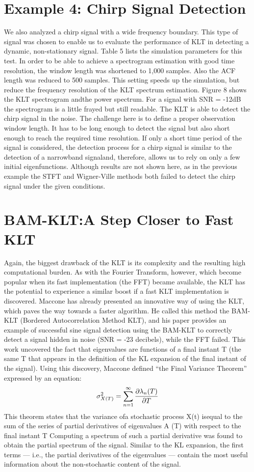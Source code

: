 \documentclass[12pt]{report}
\begin{document}
\section*{Example 4: Chirp Signal Detection}
We also analyzed a chirp signal with a wide frequency boundary. This type of
signal was chosen to enable us to evaluate the performance of KLT in detecting
a dynamic, non-stationary signal. Table 5 lists the simulation parameters for this test.
In order to be able to achieve a spectrogram estimation with good time resolution, the window length was shortened to 1,000 samples. Also the ACF length was reduced to 500 samples. This setting speeds up the simulation, but reduce the frequency resolution of the KLT spectrum estimation.
Figure 8 shows the KLT spectrogram andthe power spectrum. For a signal with SNR = -12dB the spectrogram is a little frayed but still readable. The KLT is able to detect the chirp signal in the noise.
The challenge here is to define a proper observation window length. It has to be long enough to detect the signal but also short enough to reach the required time resolution. If only a short time period of the signal is considered, the detection process for a chirp signal is similar to the detection of a narrowband signaland, therefore, allows us to rely on only a few initial eigenfunctions.
Although results are not shown here, as in the previous example the STFT and Wigner-Ville methods both failed to detect the chirp signal under the given conditions.
\section*{BAM-KLT:\@ A Step Closer to Fast KLT}
Again, the biggest drawback of the KLT is its complexity and the resulting high computational burden. As with the Fourier Transform, however, which become popular when its fast implementation (the FFT) became available, the KLT has the potential to experience a similar boost if a fast KLT implementation is discovered.
Maccone has already presented an innovative way of using the KLT, which paves the way towards a faster algorithm. He called this method the BAM-KLT (Bordered Autocorrelation Method KLT), and his paper provides an example of successful sine signal detection using the BAM-KLT to correctly detect a signal hidden in noise (SNR = -23 decibels), while the FFT failed.
This work uncovered the fact that eigenvalues are functions of a final instant T (the same T that appears in the definition of the KL expansion of the final instant of the signal). Using this discovery, Maccone defined “the Final Variance Theorem” expressed by an equation:
\begin{equation}
	\sigma_{X(T)}^2=\sum_{n=1}^{\infty}\pdv{\lambda_n(T)}{T}
	\label{eq:8}
\end{equation}
This theorem states that the variance ofa stochastic process X(t) isequal to the sum of the series of partial derivatives of eigenvalues A (T) with respect to the final instant T Computing a spectrum of such a partial derivative was found to obtain the partial spectrum of the signal. Similar to the KL expansion, the first terms — i.e., the partial derivatives of the eigenvalues — contain the most useful information about the non-stochastic content of the signal.
\end{document}
